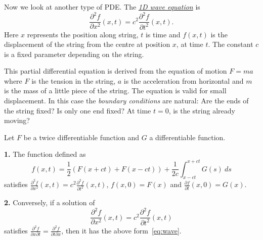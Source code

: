Now we look at another type of PDE.\@
The \href{https://en.wikipedia.org/wiki/Wave_equation}{\emph{1D wave equation}} is
\[
    \frac{\partial^2 f}{\partial x^2}(x,t) = c^2  \frac{\partial^2 f}{\partial t^2}(x,t).
\]
Here \(x\) represents the position along string,
\(t\) is time and \(f(x,t)\) is the displacement of the string from the centre at position \(x\), at time \(t\).
The constant \(c\) is a fixed parameter depending on the string.

This partial differential equation is derived from the equation of motion \(F = m a\) where \(F\) is the tension in the string, \(a\) is the acceleration from horizontal and \(m\) is the mass of a little piece of the string.
The equation is valid for small displacement.
In this case the \emph{boundary conditions} are natural: Are the ends of the string fixed? Is only one end fixed? At time \(t=0\), is the string already moving?

\begin{theorem}
    Let \(F\) be a twice differentiable function and \(G\) a differentiable function.

    \noindent
    \textbf{1.} The function defined as
    \begin{equation}
        \label{eq:wave}
        f(x,t) = \frac{1}{2}(F(x+ct) + F(x-ct)) + \frac{1}{2c} \int_{x-ct}^{x+ct} G(s) \ ds
    \end{equation}
    satisfies \(   \frac{\partial^2 f}{\partial x^2}(x,t) = c^2  \frac{\partial^2 f}{\partial t^2}(x,t) \),
    \(f(x,0) = F(x)\)
    and \(\frac{\partial f}{\partial t}(x,0) = G(x)\).

    \noindent
    \textbf{2.} Conversely, if a solution of
    \[
        \frac{\partial^2 f}{\partial x^2}(x,t) = c^2  \frac{\partial^2 f}{\partial t^2}(x,t)
    \]
    satisfies
    \(\frac{\partial^2 f}{\partial x \partial t} = \frac{\partial^2 f}{\partial t \partial x}\),
    then it has the above form~\eqref{eq:wave}.
\end{theorem}


